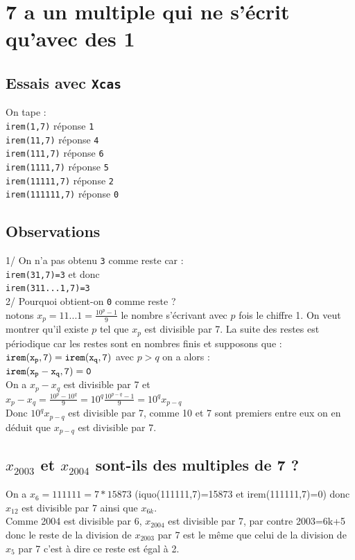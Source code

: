 \documentclass[a4paper,11pt]{book}
\begin{document}
\section{7 a un multiple qui ne s'\'ecrit qu'avec des 1}
\subsection{Essais avec {\tt Xcas}}
On tape :\\
{\tt irem(1,7)}  r\'eponse {\tt 1}\\
{\tt irem(11,7)}  r\'eponse {\tt 4}\\
{\tt irem(111,7)}  r\'eponse {\tt 6}\\
{\tt irem(1111,7)}  r\'eponse {\tt 5}\\
{\tt irem(11111,7)}  r\'eponse {\tt 2}\\
{\tt irem(111111,7)}  r\'eponse {\tt 0}
\subsection{Observations}
1/ On n'a pas obtenu {\tt 3} comme reste car :\\
{\tt irem(31,7)=3}  et donc \\
{\tt irem(311...1,7)=3}\\
2/ Pourquoi obtient-on {\tt 0} comme reste ?\\
notons $\displaystyle x_p=11...1=\frac{10^p-1}{9}$ le nombre s'\'ecrivant avec $p$ fois le 
chiffre 1. On veut montrer qu'il existe $p$ tel que $x_p$ est divisible par 7.
La suite des restes est p\'eriodique car les restes sont en nombres finis 
 et supposons que :\\
${\tt irem(x_p,7)=irem(x_q,7)}$ avec $p>q$
on a alors :\\
${\tt irem(x_p-x_q,7)=0}$\\
On a $x_p-x_q$ est divisible par 7 et \\
$x_p-x_q=\frac{10^p-10^q}{9}=10^q\frac{10^{p-q}-1}{9}=10^qx_{p-q}$\\
Donc $10^qx_{p-q}$ est divisible par 7, comme 10 et 7 sont premiers entre eux 
on en d\'eduit que $x_{p-q}$ est divisible par 7. 
\subsection{$x_{2003}$ et $x_{2004}$ sont-ils des multiples de 7 ?}
On a $x_6=111111=7*15873$ (iquo(111111,7)=15873 et irem(111111,7)=0)
donc $x_{12}$ est divisible par 7 ainsi que $x_{6k}$.\\
Comme 2004 est divisible par 6, $x_{2004}$ est divisible par 7, par contre 
2003=6k+5 donc le reste de la division de $x_{2003}$ par 7 est le m\^eme que celui de la division de $x_5$ par 7 c'est \`a dire ce reste est \'egal \`a 2.
\end{document}
